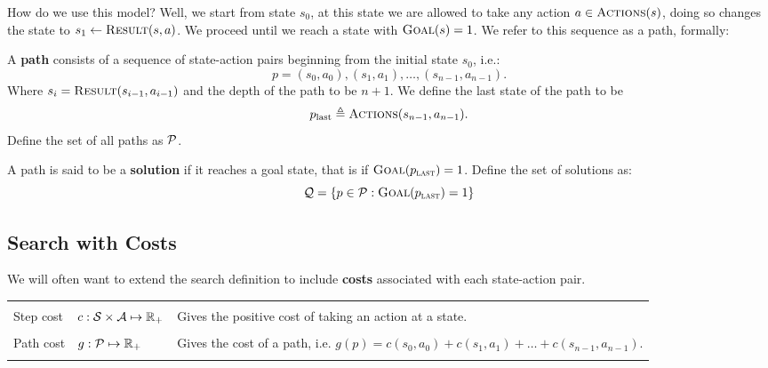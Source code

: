 \documentclass[11pt]{article}
\begin{document}
\air

\noindent How do we use this model? Well, we start from state $s_0$, at this state we are allowed to take 
any action $a \in \mathrm{\textsc{Actions}}(s)$, doing so changes the state to $s_1 \gets \mathrm{\textsc{Result}}(s, a)$. 
We proceed until we reach a state with $\mathrm{\textsc{Goal}}(s) = 1$. We refer to this sequence as a path, formally:



\begin{defn}
   A \textbf{path}
consists of a sequence of state-action pairs beginning from the initial state $s_0$, i.e.:  \[p = (s_0, a_0), (s_1, a_1), \ldots, (s_{n-1}, a_{n-1}).\] 
\noindent Where $s_i = \mathrm{\textsc{Result}}(s_{i-1}, a_{i-1})$ and the depth of the path to be $n+1$. We define the last state of the path to be  
 \[p_{\mathrm{last}} \triangleq \mathrm{\textsc{Actions}}(s_{n-1}, a_{n-1}).\] 
Define the set of all paths as $\mathcal{P}$.

\end{defn}

\begin{defn}
  A path is said to be a \textbf{solution} if it reaches a goal state, that is if $\mathrm{\textsc{Goal}}(p_{\mathrm{\textsc{last}}}) = 1$.
  Define the set of solutions as: 
  \[\mathcal{Q} = \{p \in \mathcal{P}:  \mathrm{\textsc{Goal}}(p_{\mathrm{\textsc{last}}}) = 1 \} \]
\end{defn}


\subsection{Search with Costs}

We will often want to extend the search definition to include \textbf{costs} associated with each state-action pair. 

\air

\begin{center}
\begin{tabularx}{\linewidth}{llX}
  \toprule
  \\
 Step cost & $c:\mathcal{S} \times \mathcal{A} \mapsto \mathbb{R}_+$ & Gives the positive cost of taking an action at a state. \\\\
 Path cost & $g:\mathcal{P}  \mapsto \mathbb{R}_+$ & Gives the cost of a path, i.e. $g(p) = c(s_0, a_0) +
c(s_1, a_1) + \ldots + c(s_{n-1}, a_{n-1})$. \\\\
\bottomrule
\end{tabularx}
\end{center}
\end{document}
